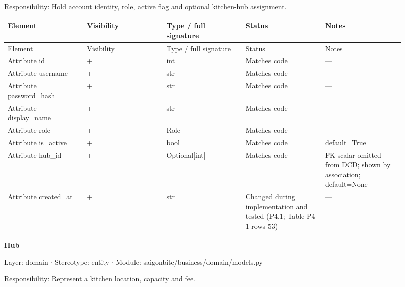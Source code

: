 Responsibility: Hold account identity, role, active flag and optional kitchen-hub assignment.

\begin{longtable}{>{\raggedright\arraybackslash}p{0.1840\linewidth}>{\raggedright\arraybackslash}p{0.1840\linewidth}>{\raggedright\arraybackslash}p{0.1840\linewidth}>{\raggedright\arraybackslash}p{0.1840\linewidth}>{\raggedright\arraybackslash}p{0.1840\linewidth}}
Element & Visibility & Type / full signature & Status & Notes \\
\hline\endfirsthead
Element & Visibility & Type / full signature & Status & Notes \\
\hline\endhead
Attribute id & + & int & Matches code & --- \\
Attribute username & + & str & Matches code & --- \\
Attribute password\_hash & + & str & Matches code & --- \\
Attribute display\_name & + & str & Matches code & --- \\
Attribute role & + & Role & Matches code & --- \\
Attribute is\_active & + & bool & Matches code & default=True \\
Attribute hub\_id & + & Optional[int] & Matches code & FK scalar omitted from DCD; shown by association; default=None \\
Attribute created\_at & + & str & Changed during implementation and tested (P4.1; Table P4-1 rows 53) & --- \\
\end{longtable}
\textbf{Hub}

Layer: domain \ensuremath{\cdot} Stereotype: \guillemotleft{}entity\guillemotright{} \ensuremath{\cdot} Module: saigonbite/business/domain/models.py

Responsibility: Represent a kitchen location, capacity and fee.

